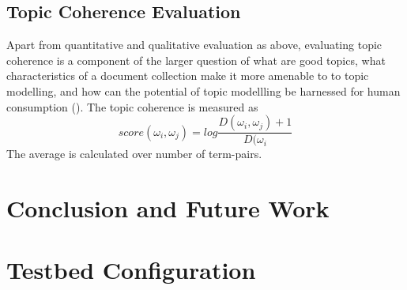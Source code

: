 \documentclass[11pt,twoside]{report}
\begin{document}
\section{Topic Coherence Evaluation}
Apart from quantitative and qualitative evaluation as above, evaluating topic coherence is a component of the larger question of what are good topics, what characteristics of a document collection make it more amenable to to topic modelling, and how can the potential of topic modellling be harnessed for human consumption (\cite{ref27}). The topic coherence is measured as
\begin{equation}
score(\omega_i, \omega_j) = log\frac{D(\omega_i, \omega_j) + 1}{D(\omega_i}
\end{equation}
The average is calculated over number of term-pairs.

\chapter{Conclusion and Future Work}

\appendix
\chapter{Testbed Configuration}



\end{document}
